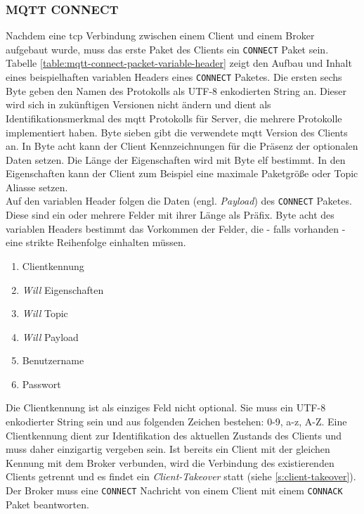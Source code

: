 \subsubsection{MQTT CONNECT} \label{s:mqtt-connect}
Nachdem eine \ac{tcp} Verbindung zwischen einem Client und einem Broker aufgebaut wurde, muss das erste Paket des Clients ein \verb|CONNECT| Paket sein.
Tabelle \ref{table:mqtt-connect-packet-variable-header} zeigt den Aufbau und Inhalt eines beispielhaften variablen Headers eines \verb|CONNECT| Paketes.
Die ersten sechs Byte geben den Namen des Protokolls als UTF-8 enkodierten String an. Dieser wird sich in zukünftigen Versionen nicht ändern und dient als Identifikationsmerkmal des \ac{mqtt} Protokolls für Server, die mehrere Protokolle implementiert haben. Byte sieben gibt die verwendete \ac{mqtt} Version des Clients an. In Byte acht kann der Client Kennzeichnungen für die Präsenz der optionalen Daten setzen. Die Länge der Eigenschaften wird mit Byte elf bestimmt. In den Eigenschaften kann der Client zum Beispiel eine maximale Paketgrö{\ss}e oder Topic Aliasse setzen.\cite{mqtt5Specification}\\
Auf den variablen Header folgen die Daten (engl. \textit{Payload}) des \verb|CONNECT| Paketes. Diese sind ein oder mehrere Felder mit ihrer Länge als Präfix. Byte acht des variablen Headers bestimmt das Vorkommen der Felder, die - falls vorhanden - eine strikte Reihenfolge einhalten müssen.
\cite{mqtt5Specification}
\begin{enumerate}
    \item Clientkennung
    \item \textit{Will} Eigenschaften
    \item \textit{Will} Topic
    \item \textit{Will} Payload
    \item Benutzername
    \item Passwort
\end{enumerate}
Die Clientkennung ist als einziges Feld nicht optional. Sie muss ein UTF-8 enkodierter String sein und aus folgenden Zeichen bestehen: 0-9, a-z, A-Z.
Eine Clientkennung dient zur Identifikation des aktuellen Zustands des Clients und muss daher einzigartig vergeben sein. Ist bereits ein Client mit der gleichen Kennung mit dem Broker verbunden, wird die Verbindung des existierenden Clients getrennt und es findet ein \textit{Client-Takeover} statt (siehe \ref{s:client-takeover}).
Der Broker muss eine \verb|CONNECT| Nachricht von einem Client mit einem \verb|CONNACK| Paket beantworten.
\cite{mqtt5Specification}
